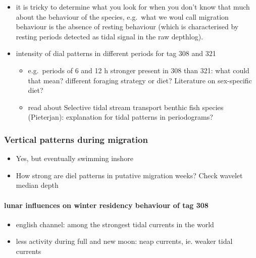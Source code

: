 \documentclass[
  authoryear,
  review,
  3p]{elsarticle}
\let\oldparagraph\paragraph
\renewcommand{\paragraph}[1]{\oldparagraph{#1}\mbox{}}
\providecommand{\tightlist}{%
  \setlength{\itemsep}{0pt}\setlength{\parskip}{0pt}}\usepackage{longtable,booktabs,array}
\begin{document}
\begin{itemize}
\item
  it is tricky to determine what you look for when you don't know that
  much about the behaviour of the species, e.g.~what we woul call
  migration behaviour is the absence of resting behaviour (which is
  characterised by resting periods detected as tidal signal in the raw
  depthlog).
\item
  intensity of dial patterns in different periods for tag 308 and 321

  \begin{itemize}
  \tightlist
  \item
    e.g.~periods of 6 and 12 h stronger present in 308 than 321: what
    could that mean? different foraging strategy or diet? Literature on
    sex-specific diet?
  \item
    read about Selective tidal stream transport benthic fish species
    (Pieterjan): explanation for tidal patterns in periodograms?
  \end{itemize}
\end{itemize}

\hypertarget{vertical-patterns-during-migration}{%
\subsubsection{Vertical patterns during
migration}\label{vertical-patterns-during-migration}}

\begin{itemize}
\tightlist
\item
  Yes, but eventually swimming inshore
\item
  How strong are diel patterns in putative migration weeks? Check
  wavelet median depth
\end{itemize}

\hypertarget{lunar-influences-on-winter-residency-behaviour-of-tag-308}{%
\paragraph{lunar influences on winter residency behaviour of tag
308}\label{lunar-influences-on-winter-residency-behaviour-of-tag-308}}

\begin{itemize}
\tightlist
\item
  english channel: among the strongest tidal currents in the world
\item
  less activity during full and new moon: neap currents, ie. weaker
  tidal currents
\end{itemize}
\end{document}
